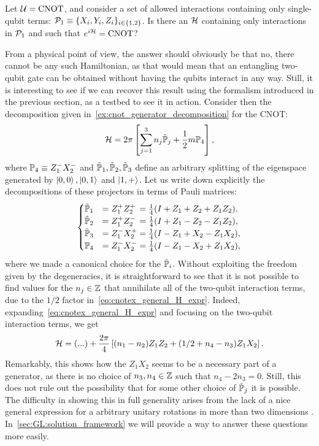 \begin{example}[label={ex:cnot_physical_constraints}]
Let ${\mathcal{U}}=\operatorname{CNOT}$, and consider a set of allowed interactions containing only single-qubit terms: ${\mathcal{P}}_1\equiv\{X_i,Y_i,Z_i\}_{i\in\{1,2\}}$.
Is there an ${\mathcal{H}}$ containing only interactions in ${\mathcal{P}}_1$ and such that $e^{i{\mathcal{H}}}=\operatorname{CNOT}$?

From a physical point of view, the answer should obviously be that no, there cannot be any such Hamiltonian, as that would mean that an entangling two-qubit gate can be obtained without having the qubits interact in any way.
Still, it is interesting to see if we can recover this result using the formalism introduced in the previous section, as a testbed to see it in action.
Consider then the decomposition given in~\cref{ex:cnot_generator_decomposition} for the CNOT:
\begin{equation}
    {\mathcal{H}} =
    2\pi\left[
    \sum_{j=1}^3 n_j \tilde{\mathbb{P}}_j +
    \frac{1}{2} m\mathbb{P}_4
    \right],
\label{eq:cnotex_general_H_expr}
\end{equation}
where
$\mathbb{P}_4\equiv Z_1^- X_2^-$ and $\tilde{\mathbb{P}}_1,\tilde{\mathbb{P}}_2,\tilde{\mathbb{P}}_3$ define an arbitrary splitting of the eigenspace generated by $\ket{0,0},\ket{0,1}$ and $\ket{1,+}$.
Let us write down explicitly the decompositions of these projectors in terms of Pauli matrices:
\begin{equation}
\begin{cases}
    \tilde{\mathbb{P}}_1 &= Z_1^+ Z_2^+ \,= \frac{1}{4} (I + Z_1 + Z_2 + Z_1 Z_2), \\
    \tilde{\mathbb{P}}_2 &= Z_1^+ Z_2^- \,= \frac{1}{4} (I + Z_1 - Z_2 - Z_1 Z_2), \\
    \tilde{\mathbb{P}}_3 &= Z_1^- X_2^+ = \frac{1}{4} (I - Z_1 + X_2 - Z_1 X_2), \\
    \mathbb{P}_4 &= Z_1^- X_2^- = \frac{1}{4} (I - Z_1 - X_2 + Z_1 X_2),
\end{cases}
\end{equation}
where we made a canonical choice for the $\tilde{\mathbb{P}}_i$.
Without exploiting the freedom given by the degeneracies, it is straightforward to see that it is not possible to find values for the $n_j\in\mathbb{Z}$ that annihilate all of the two-qubit interaction terms, due to the $1/2$ factor in~\cref{eq:cnotex_general_H_expr}.
Indeed, expanding~\cref{eq:cnotex_general_H_expr} and focusing on the two-qubit interaction terms, we get
\begin{equation}
    {\mathcal{H}} = (...) + \frac{2\pi}{4}\left[
    (n_1 - n_2) Z_1 Z_2 +
    (1/2 + n_4 - n_3) Z_1 X_2
    \right].
\end{equation}
Remarkably, this shows how the $Z_1 X_2$ seems to be a necessary part of a generator, as there is no choice of $n_3,n_4\in\mathbb{Z}$ such that $n_4-2 n_3=0$.
Still, this does not rule out the possibility that for some other choice of $\tilde{\mathbb{P}}_j$ it is possible.
The difficulty in showing this in full generality arises from the lack of a nice general expression for a arbitrary unitary rotations in more than two dimensions .
In~\cref{sec:GL:solution_framework} we will provide a way to answer these questions more easily.
\end{example}

